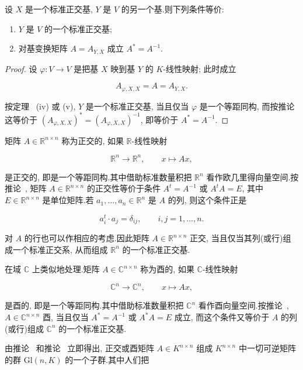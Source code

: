 \begin{theorem}\label{thm:7.5.4}
设 $X$ 是一个标准正交基, $Y$ 是 $V$ 的另一个基.则下列条件等价:
\begin{enumerate}
\item[(i)] $Y$ 是 $V$ 的一个标准正交基;
\item[(ii)] 对基变换矩阵 $A = A_{Y, X}$ 成立 $A^* = A^{-1}$.
\end{enumerate}
\end{theorem}

\begin{proof}
设 $\varphi \colon V \longrightarrow V$ 是把基 $X$ 映到基 $Y$ 的 $K$-线性映射; 此时成立

\[
A_{\varphi, X, X} = A = A_{Y, X}\text{.}
\]

按定理~ (iv) 或 (v), $Y$ 是一个标准正交基, 当且仅当 $\varphi$ 是一个等距同构, 而按推论~ 这等价于 $(A_{\varphi, X, X})^* = (A_{\varphi, X, X})^{-1}$, 即等价于 $A^* = A^{-1}$.
\end{proof}

矩阵 $A \in \mathbb{R}^{n \times n}$ 称为正交的, 如果 $\mathbb{R}$-线性映射

\[
\mathbb{R}^n \longrightarrow \mathbb{R}^n, \qquad x \longmapsto A x,
\]

是正交的, 即是一个等距同构.其中借助标准数量积把 $\mathbb{R}^n$ 看作欧几里得向量空间.按推论~, 矩阵 $A \in \mathbb{R}^{n \times n}$ 的正交性等价于条件 $A^t = A^{-1}$ 或 $A^t A = E$, 其中 $E \in \mathbb{R}^{n \times n}$ 是单位矩阵.若 $a_1, \ldots, a_n \in \mathbb{R}^n$ 是 $A$ 的列, 则这个条件正是

\[
a_i^t \cdot a_j = \delta_{ij}, \qquad i, j = 1, \ldots, n\text{.}
\]

对 $A$ 的行也可以作相应的考虑.因此矩阵 $A \in \mathbb{R}^{n \times n}$ 正交, 当且仅当其列(或行)组成一个标准正交系, 从而组成 $\mathbb{R}^n$ 的一个标准正交基.

在域 $\mathbb{C}$ 上类似地处理.矩阵 $A \in \mathbb{C}^{n \times n}$ 称为酉的, 如果 $\mathbb{C}$-线性映射

\[
\mathbb{C}^n \longrightarrow \mathbb{C}^n, \qquad x \longmapsto A x,
\]

是酉的, 即是一个等距同构.其中借助标准数量积把 $\mathbb{C}^n$ 看作酉向量空间.按推论~, $A \in \mathbb{C}^{n \times n}$ 酉, 当且仅当 $A^* = A^{-1}$ 或 $A^* A = E$ 成立, 而这个条件又等价于 $A$ 的列(或行)组成 $\mathbb{C}^n$ 的一个标准正交基.

由推论~ 和推论~ 立即得出, 正交或酉矩阵 $A \in K^{n \times n}$ 组成 $K^{n \times n}$ 中一切可逆矩阵的群 $\mathrm{Gl}(n, K)$ 的一个子群.其中人们把

